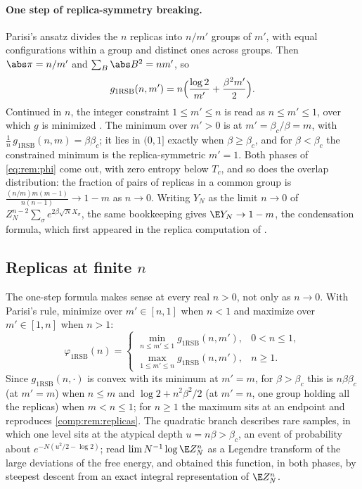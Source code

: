 \begin{refsection}
\paragraph{One step of replica-symmetry breaking.} Parisi's ansatz divides the $n$ replicas into $n/m'$ groups of $m'$, with equal configurations within a group and distinct ones across groups. Then $\abs\pi=n/m'$ and $\sum_B\abs B^2=nm'$, so
\begin{equation}\label{eq:rem:g1rsb}
g_{\mathrm{1RSB}}(n,m')=n\Bigl(\frac{\log2}{m'}+\frac{\beta^2m'}2\Bigr).
\end{equation}
Continued in $n$, the integer constraint $1\le m'\le n$ is read as $n\le m'\le1$, over which $g$ is minimized \parencite[ch.~8]{MezardMontanari2009}. The minimum over $m'>0$ is at $m'=\beta_c/\beta=m$, with $\frac1n\,g_{\mathrm{1RSB}}(n,m)=\beta\beta_c$; it lies in $(0,1]$ exactly when $\beta\ge\beta_c$, and for $\beta<\beta_c$ the constrained minimum is the replica-symmetric $m'=1$. Both phases of \eqref{eq:rem:phi} come out, with zero entropy below $T_c$, and so does the overlap distribution: the fraction of pairs of replicas in a common group is $\frac{(n/m)m(m-1)}{n(n-1)}\to1-m$ as $n\to0$. Writing $Y_N$ as the limit $n\to0$ of $Z_N^{n-2}\sum_\sigma e^{2\beta\sqrt NX_\sigma}$, the same bookkeeping gives $\E Y_N\to1-m$, the condensation formula, which first appeared in the replica computation of \textcite{GrossMezard1984} \parencite[notes to ch.~5]{MezardMontanari2009}.

\subsection{Replicas at finite \texorpdfstring{$n$}{n}}\label{sec:rem:finiten}

The one-step formula makes sense at every real $n>0$, not only as $n\to0$. With Parisi's rule, minimize over $m'\in[n,1]$ when $n<1$ and maximize over $m'\in[1,n]$ when $n>1$:
\begin{equation}\label{eq:rem:phi1rsb}
\varphi_{\mathrm{1RSB}}(n)=\begin{cases}\min_{n\le m'\le1}g_{\mathrm{1RSB}}(n,m'),&0<n\le1,\\ \max_{1\le m'\le n}g_{\mathrm{1RSB}}(n,m'),&n\ge1.\end{cases}
\end{equation}
Since $g_{\mathrm{1RSB}}(n,\cdot)$ is convex with its minimum at $m'=m$, for $\beta>\beta_c$ this is $n\beta\beta_c$ (at $m'=m$) when $n\le m$ and $\log2+n^2\beta^2/2$ (at $m'=n$, one group holding all the replicas) when $m<n\le1$; for $n\ge1$ the maximum sits at an endpoint and reproduces \cref{comp:rem:replicas}. The quadratic branch describes rare samples, in which one level sits at the atypical depth $u=n\beta>\beta_c$, an event of probability about $e^{-N(u^2/2-\log2)}$; \textcite[chs.~5, 8]{MezardMontanari2009} read $\lim N^{-1}\log\E Z_N^n$ as a Legendre transform of the large deviations of the free energy, and \textcite[App.~A]{OgureKabashima2009a} obtained this function, in both phases, by steepest descent from an exact integral representation of $\E Z_N^n$.


\end{refsection}
